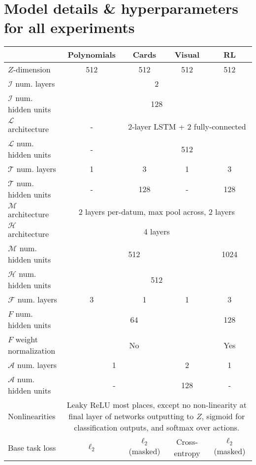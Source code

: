 \chapter{Model details \& hyperparameters for all experiments} \label{appendix:model_hyperparameters}
\begin{table}
\scriptsize
\centering
\begin{tabular}{|p{3cm}||c|c|c|c|}
\hline
& Polynomials & Cards & Visual & RL \\\hline
\hline
$Z$-dimension & 512 & 512 & 512 & 512 \\\hline
$\mathcal{I}$ num. layers & \multicolumn{4}{c|}{2} \\\hline
$\mathcal{I}$ num. hidden units & \multicolumn{4}{c|}{128} \\\hline
$\mathcal{L}$ architecture & -  & \multicolumn{3}{c|}{2-layer LSTM + 2 fully-connected} \\\hline
$\mathcal{L}$ num. hidden units & -  & \multicolumn{3}{c|}{512} \\\hline
$\mathcal{T}$ num. layers & 1 & 3 & 1 & 3 \\\hline
$\mathcal{T}$ num. hidden units & - & 128 & - & 128 \\\hline
$\mathcal{M}$ architecture & \multicolumn{4}{c|}{2 layers per-datum, max pool across, 2 layers} \\\hline
$\mathcal{H}$ architecture & \multicolumn{4}{c|}{4 layers} \\\hline
$\mathcal{M}$ num. hidden units & \multicolumn{3}{c|}{512} & 1024 \\\hline
$\mathcal{H}$ num. hidden units & \multicolumn{4}{c|}{512} \\\hline
$\mathcal{F}$ num. layers & 3 & 1 & 1 & 3 \\\hline
$F$ num. hidden units & \multicolumn{3}{c|}{64} & 128 \\\hline
$F$ weight normalization \citep{Salimans2016} & \multicolumn{3}{c|}{No} & Yes \\\hline
$\mathcal{A}$ num. layers & \multicolumn{2}{c|}{1} & 2 & 1 \\\hline
$\mathcal{A}$ num. hidden units & \multicolumn{2}{c|}{-} & 128 & -  \\\hline
Nonlinearities & \multicolumn{4}{p{11cm}|}{Leaky ReLU most places, except no non-linearity at final layer of networks outputting to $Z$, sigmoid for classification outputs, and softmax over actions.} \\\hline
Base task loss & $\ell_2$ & $\ell_2$ (masked) & Cross-entropy & $\ell_2$ (masked)\\\hline

\end{tabular}
\end{table}
